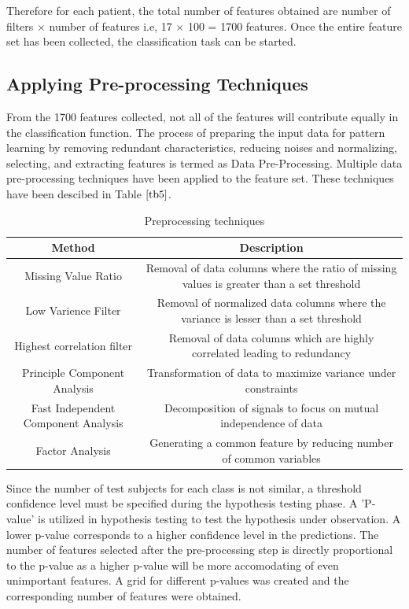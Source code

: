 \documentclass[10pt,journal,compsoc]{IEEEtran}
\begin{document}
Therefore for each patient, the total number of features obtained are number of filters $\times$ number of features i.e, 17 $\times$ 100 = 1700 features. Once the entire feature set has been collected, the classification task can be started. 

\subsection{Applying Pre-processing Techniques}

From the 1700 features collected, not all of the features will contribute equally in the classification function. The process of preparing the input data for pattern learning by removing redundant characteristics, reducing noises and normalizing, selecting, and extracting features is termed as Data Pre-Processing. Multiple data pre-processing techniques have been applied to the feature set. These techniques have been descibed in Table $\ref{tb5}$.

\begin{table}[!b]
\centering
\caption{Preprocessing techniques}
\label{tb5}
\begin{tabular}{| c | c |}
\hline
Method & Description\\
\hline
Missing Value Ratio & Removal of data columns where the ratio of missing values is greater than a set threshold \\
\hline
Low Varience Filter & Removal of normalized data columns where the variance is lesser than a set threshold\\
\hline
Highest correlation filter & Removal of data columns which are highly correlated leading to redundancy\\
\hline
Principle Component Analysis & Transformation of data to maximize variance under constraints\\
\hline
Fast Independent Component Analysis & Decomposition of signals to focus on mutual independence of data \\
\hline
Factor Analysis & Generating a common feature by reducing number of common variables \\
\hline
\end{tabular}
\end{table}

Since the number of test subjects for each class is not similar, a threshold confidence level must be specified during the hypothesis testing phase. A 'P-value' is utilized in hypothesis testing to test the hypothesis under observation. A lower p-value corresponds to a higher confidence level in the predictions. The number of features selected after the pre-processing step is directly proportional to the p-value as a higher p-value will be more accomodating of even unimportant features. A grid for different p-values was created and the corresponding number of features were obtained.   
\end{document}
